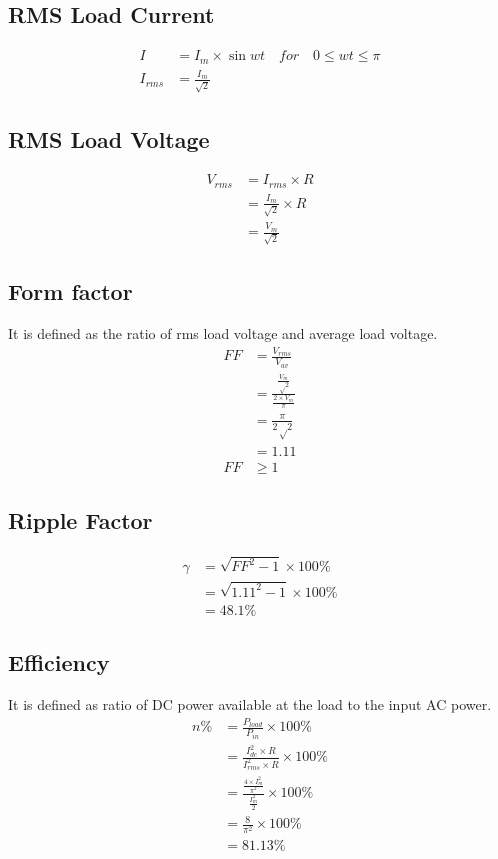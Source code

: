 		\subsection{RMS Load Current}
			\begin{align*}		
				I &= I_m \times \sin wt \quad for \quad 0 \leq wt \leq \pi\\
				I_{rms} &= \frac{I_m }{\sqrt{2}}
			\end{align*}
		
		\subsection{RMS Load Voltage}
			\begin{align*}		
				V_{rms} &= I_{rms} \times R \\
				&= \frac{I_m}{\sqrt{2}} \times R\\
				&=\frac{V_m}{\sqrt{2}}
			\end{align*}
			
		\subsection{Form factor}
			It is defined as the ratio of rms load voltage and average load voltage.
			\begin{align*}
				FF &= \frac{V_{rms}}{V_{av}}\\
				&= \frac{\frac{V_{m}}{√2}}{\frac{2 \times V_m}{\pi}}\\
				&= \frac{\pi}{2√2}\\
				&= 1.11\\
				FF &\geq 1
			\end{align*}
		
		\subsection{Ripple Factor}
			\begin{align*}
				\gamma &= \sqrt{{FF}^2-1}\times 100\%\\
				&= \sqrt{{1.11}^2-1} \times 100\%\\
				&= 48.1\%
			\end{align*}
		
		\subsection{Efficiency}
			It is defined as ratio of DC power available at the load to the input AC power.
			\begin{align*}
				n\% &= \frac{P_{load}}{P_{in}} \times 100\%\\
				&= \frac {{I_{dc}^2} \times R}{{I_{rms}^2} \times R}\times 100\%\\
				&= \frac{\frac {4 \times I_{m}^2}{\pi^2}}{\frac{I_{m}^2}{2}}\times 100\%\\
				&= \frac{8}{\pi^2}\times 100\% \\
				&= 81.13\%
			\end{align*}
		
